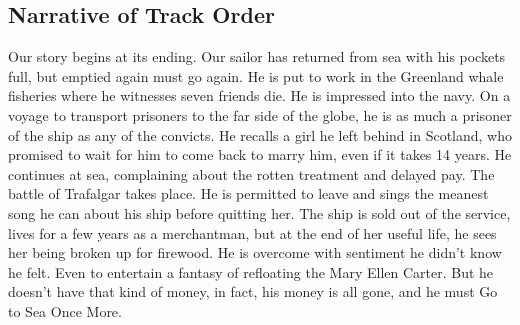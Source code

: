 \documentclass{article}[12pt,letterpaper]
\begin{document}
\subsection{Narrative of Track Order} Our  story begins at its ending. Our sailor has returned from sea with his pockets full, but emptied again must go again. He is put to work in the Greenland whale fisheries where he witnesses seven friends die. He is impressed into the navy. On a voyage to transport prisoners to the far side of the globe, he is as much a prisoner of the ship as any of the convicts. He recalls a girl he left behind in Scotland, who promised to wait for him to come back to marry him, even if it takes 14 years. He continues at sea, complaining about the rotten treatment and delayed pay. The battle of Trafalgar takes place. He is permitted to leave and sings the meanest song he can about his ship before quitting her. The ship is sold out of the service, lives for a few years as a merchantman, but at the end of her useful life, he sees her being broken up for firewood. He is overcome with sentiment he didn’t know he felt. Even to entertain a fantasy of refloating the Mary Ellen Carter. But he doesn’t have that kind of money, in fact, his money is all gone, and he must Go to Sea Once More.
\end{document}
